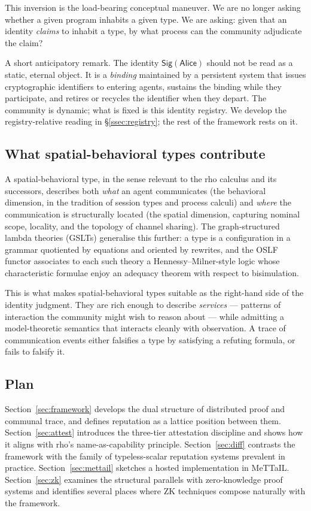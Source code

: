 \documentclass[11pt]{article}
\theoremstyle{definition}
\theoremstyle{plain}
\theoremstyle{remark}
\newcommand{\Sig}{\mathsf{Sig}}
\newcommand{\Alice}{\mathsf{Alice}}
\begin{document}
This inversion is the load-bearing conceptual maneuver. We are no longer asking whether a given program inhabits a given type. We are asking: given that an identity \emph{claims} to inhabit a type, by what process can the community adjudicate the claim?

A short anticipatory remark. The identity $\Sig(\Alice)$ should not be read as a static, eternal object. It is a \emph{binding} maintained by a persistent system that issues cryptographic identifiers to entering agents, sustains the binding while they participate, and retires or recycles the identifier when they depart. The community is dynamic; what is fixed is this identity registry. We develop the registry-relative reading in \S\ref{ssec:registry}; the rest of the framework rests on it.

\subsection{What spatial-behavioral types contribute}

A spatial-behavioral type, in the sense relevant to the rho calculus and its successors, describes both \emph{what} an agent communicates (the behavioral dimension, in the tradition of session types and process calculi) and \emph{where} the communication is structurally located (the spatial dimension, capturing nominal scope, locality, and the topology of channel sharing). The graph-structured lambda theories (GSLTs) generalise this further: a type is a configuration in a grammar quotiented by equations and oriented by rewrites, and the OSLF functor associates to each such theory a Hennessy--Milner-style logic whose characteristic formulae enjoy an adequacy theorem with respect to bisimulation.

This is what makes spatial-behavioral types suitable as the right-hand side of the identity judgment. They are rich enough to describe \emph{services} --- patterns of interaction the community might wish to reason about --- while admitting a model-theoretic semantics that interacts cleanly with observation. A trace of communication events either falsifies a type by satisfying a refuting formula, or fails to falsify it.

\subsection{Plan}

Section~\ref{sec:framework} develops the dual structure of distributed proof and communal trace, and defines reputation as a lattice position between them. Section~\ref{sec:attest} introduces the three-tier attestation discipline and shows how it aligns with rho's name-as-capability principle. Section~\ref{sec:diff} contrasts the framework with the family of typeless-scalar reputation systems prevalent in practice. Section~\ref{sec:mettail} sketches a hosted implementation in MeTTaIL. Section~\ref{sec:zk} examines the structural parallels with zero-knowledge proof systems and identifies several places where ZK techniques compose naturally with the framework.
\end{document}
